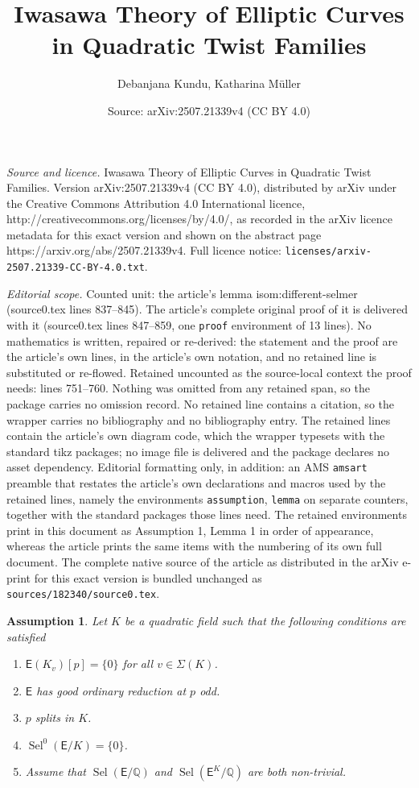 \documentclass[10pt,a4paper]{amsart}
\title{Iwasawa Theory of Elliptic Curves in Quadratic Twist Families}
\author{Debanjana Kundu, Katharina M\"uller}
\date{Source: arXiv:2507.21339v4 (CC BY 4.0)}
\newtheorem{assumption}{Assumption}
\newcommand{\EC}{\mathsf{E}}
\newcommand{\Q}{\mathbb{Q}}
\newcommand{\Sel}{\operatorname{Sel}}
\begin{document}
\maketitle

\noindent\emph{Source and licence.} Iwasawa Theory of Elliptic Curves in Quadratic Twist Families. Version arXiv:2507.21339v4 (CC BY 4.0), distributed by arXiv under the Creative Commons Attribution 4.0 International licence, http://creativecommons.org/licenses/by/4.0/, as recorded in the arXiv licence metadata for this exact version and shown on the abstract page https://arxiv.org/abs/2507.21339v4. Full licence notice: \texttt{licenses/arxiv-2507.21339-CC-BY-4.0.txt}.\par\smallskip

\noindent\textit{Editorial scope.} Counted unit: the article's lemma isom:different-selmer (source0.tex lines 837--845). The article's complete original proof of it is delivered with it (source0.tex lines 847--859, one \texttt{proof} environment of 13 lines). No mathematics is written, repaired or re-derived: the statement and the proof are the article's own lines, in the article's own notation, and no retained line is substituted or re-flowed.  Retained uncounted as the source-local context the proof needs: lines 751--760.  Nothing was omitted from any retained span, so the package carries no omission record.  No retained line contains a citation, so the wrapper carries no bibliography and no bibliography entry.  The retained lines contain the article's own diagram code, which the wrapper typesets with the standard tikz packages; no image file is delivered and the package declares no asset dependency.  Editorial formatting only, in addition: an AMS \texttt{amsart} preamble that restates the article's own declarations and macros used by the retained lines, namely the environments \texttt{assumption}, \texttt{lemma} on separate counters, together with the standard packages those lines need.  The retained environments print in this document as Assumption 1, Lemma 1 in order of appearance, whereas the article prints the same items with the numbering of its own full document.  The complete native source of the article as distributed in the arXiv e-print for this exact version is bundled unchanged as \texttt{sources/182340/source0.tex}.
\begin{assumption}\label{ass}Let $K$ be a quadratic field such that the following conditions are satisfied
    \begin{enumerate}
    \item[\textup{(}i\textup{)}] $\EC(K_v)[p]=\{0\}$ for all $v\in \Sigma(K)$.
    \item[\textup{(}ii\textup{)}] $\EC$ has good ordinary reduction at $p$ odd.
    \item[\textup{(}iii\textup{)}] $p$ splits in $K$.
    \item [\textup{(}iv\textup{)}] $\Sel^0(\EC/K)= \{0\}$.
    \item[\textup{(}v\textup{)}]
    Assume that $\Sel(\EC/\Q)$ and $\Sel(\EC^K/\Q)$ are both non-trivial.
\end{enumerate}
\end{assumption}
\end{document}
